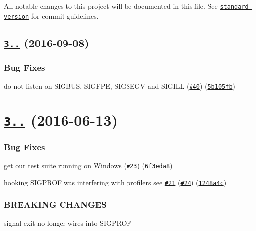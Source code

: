 All notable changes to this project will be documented in this file. See \href{https://github.com/conventional-changelog/standard-version}{\tt standard-\/version} for commit guidelines.

\label{_3.0.1}%
 \subsection*{\href{https://github.com/tapjs/signal-exit/compare/v3.0.0...v3.0.1}{\tt 3..} (2016-\/09-\/08)}

\subsubsection*{Bug Fixes}


\begin{DoxyItemize}
\item do not listen on S\+I\+G\+B\+US, S\+I\+G\+F\+PE, S\+I\+G\+S\+E\+GV and S\+I\+G\+I\+LL (\href{https://github.com/tapjs/signal-exit/issues/40}{\tt \#40}) (\href{https://github.com/tapjs/signal-exit/commit/5b105fb}{\tt 5b105fb})
\end{DoxyItemize}

\label{_3.0.0}%
 \section*{\href{https://github.com/tapjs/signal-exit/compare/v2.1.2...v3.0.0}{\tt 3..} (2016-\/06-\/13)}

\subsubsection*{Bug Fixes}


\begin{DoxyItemize}
\item get our test suite running on Windows (\href{https://github.com/tapjs/signal-exit/issues/23}{\tt \#23}) (\href{https://github.com/tapjs/signal-exit/commit/6f3eda8}{\tt 6f3eda8})
\item hooking S\+I\+G\+P\+R\+OF was interfering with profilers see \href{https://github.com/tapjs/signal-exit/issues/21}{\tt \#21} (\href{https://github.com/tapjs/signal-exit/issues/24}{\tt \#24}) (\href{https://github.com/tapjs/signal-exit/commit/1248a4c}{\tt 1248a4c})
\end{DoxyItemize}

\subsubsection*{B\+R\+E\+A\+K\+I\+NG C\+H\+A\+N\+G\+ES}


\begin{DoxyItemize}
\item signal-\/exit no longer wires into S\+I\+G\+P\+R\+OF 
\end{DoxyItemize}